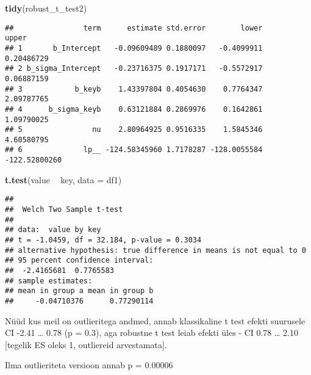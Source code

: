 \documentclass[]{article}
\newenvironment{Shaded}{\begin{snugshade}}{\end{snugshade}}
\newcommand{\KeywordTok}[1]{\textcolor[rgb]{0.13,0.29,0.53}{\textbf{#1}}}
\newcommand{\DataTypeTok}[1]{\textcolor[rgb]{0.13,0.29,0.53}{#1}}
\newcommand{\DecValTok}[1]{\textcolor[rgb]{0.00,0.00,0.81}{#1}}
\newcommand{\FloatTok}[1]{\textcolor[rgb]{0.00,0.00,0.81}{#1}}
\newcommand{\StringTok}[1]{\textcolor[rgb]{0.31,0.60,0.02}{#1}}
\newcommand{\OperatorTok}[1]{\textcolor[rgb]{0.81,0.36,0.00}{\textbf{#1}}}
\newcommand{\NormalTok}[1]{#1}
\begin{document}
\begin{Shaded}
\begin{Highlighting}[]
\KeywordTok{tidy}\NormalTok{(robust_t_test2)}
\end{Highlighting}
\end{Shaded}

\begin{verbatim}
##                term      estimate std.error        lower         upper
## 1       b_Intercept   -0.09609489 0.1880097   -0.4099911    0.20486729
## 2 b_sigma_Intercept   -0.23716375 0.1917171   -0.5572917    0.06887159
## 3            b_keyb    1.43397804 0.4054630    0.7764347    2.09787765
## 4      b_sigma_keyb    0.63121884 0.2869976    0.1642861    1.09790025
## 5                nu    2.80964925 0.9516335    1.5845346    4.60580795
## 6              lp__ -124.58345960 1.7178287 -128.0055584 -122.52800260
\end{verbatim}

\begin{Shaded}
\begin{Highlighting}[]
\KeywordTok{t.test}\NormalTok{(value }\OperatorTok{~}\StringTok{ }\NormalTok{key, }\DataTypeTok{data =}\NormalTok{ df1)}
\end{Highlighting}
\end{Shaded}

\begin{verbatim}
## 
##  Welch Two Sample t-test
## 
## data:  value by key
## t = -1.0459, df = 32.184, p-value = 0.3034
## alternative hypothesis: true difference in means is not equal to 0
## 95 percent confidence interval:
##  -2.4165681  0.7765583
## sample estimates:
## mean in group a mean in group b 
##     -0.04710376      0.77290114
\end{verbatim}

Nüüd kus meil on outlieritega andmed, annab klassikaline t test efekti
suurusele CI -2.41 \ldots{} 0.78 (p = 0.3), aga robustne t test leiab
efekti üles - CI 0.78 \ldots{} 2.10 {[}tegelik ES oleks 1, outliereid
arvestamata{]}.

Ilma outlieriteta versioon annab p = 0.00006

\begin{Shaded}
\end{Shaded}
\end{document}
